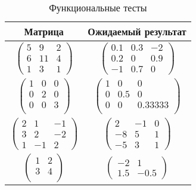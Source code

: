 \begin{table}[h!]
	\begin{center}
        \caption{\label{tab:tests}Функциональные тесты}
        \begin{tabular}{|c|c|}
			\hline
            \textbf{Матрица} & \textbf{Ожидаемый
            результат}\\ [2mm]
            \hline
			$\begin{pmatrix}
                5 & 9 & 2\\
                6 & 11 & 4\\
                1 & 3 & 1
			\end{pmatrix}$ &
			$\begin{pmatrix}
                0.1 & 0.3 & -2\\
                0.2 & 0 & 0.9\\
                -1 & 0.7 & 0
			\end{pmatrix}$\\
            \hline
            $\begin{pmatrix}
                1 & 0 & 0 \\
                0 & 2 & 0 \\
                0 & 0 & 3 \\
			\end{pmatrix}$ &
			$\begin{pmatrix}
                1 & 0 & 0 \\
                0 & 0.5 & 0 \\
                0 & 0& 0.33333 \\
			\end{pmatrix}$\\
            \hline
			$\begin{pmatrix}
                2 & 1 & -1 \\
                3 & 2 & -2 \\
                1 & -1 & 2
			\end{pmatrix}$ &
			$\begin{pmatrix}
                2 & -1 & 0 \\
                -8 & 5 & 1 \\
                -5 & 3 & 1
			\end{pmatrix}$\\
            \hline
			$\begin{pmatrix}
                1 & 2\\
                3 & 4\\
			\end{pmatrix}$ &
            $\begin{pmatrix}
                -2 & 1\\
                1.5 & -0.5
			\end{pmatrix}$\\
            \hline
		\end{tabular}
	\end{center}
\end{table}

